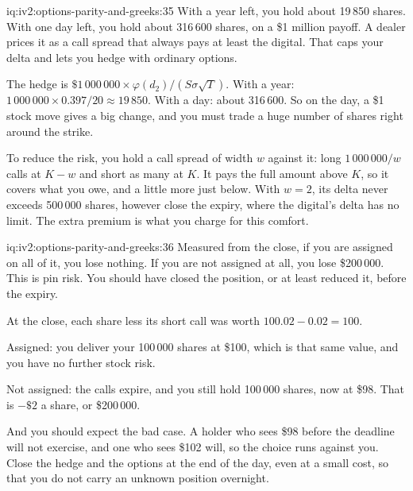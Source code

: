 \begin{solution}{iq:iv2:options-parity-and-greeks:35}
With a year left, you hold about 19\,850 shares. With one day left, you hold about 316\,600 shares, on a \$1 million payoff. A dealer prices it as a call spread that always pays at least the digital. That caps your delta and lets you hedge with ordinary options.

The hedge is $\$1\,000\,000 \times \varphi(d_2)/(S\sigma\sqrt T)$. With a year: $1\,000\,000 \times 0.397/20 \approx 19\,850$. With a day: about 316\,600. So on the day, a \$1 stock move gives a big change, and you must trade a huge number of shares right around the strike.

To reduce the risk, you hold a call spread of width $w$ against it: long $1\,000\,000/w$ calls at $K - w$ and short as many at $K$. It pays the full amount above $K$, so it covers what you owe, and a little more just below. With $w = 2$, its delta never exceeds 500\,000 shares, however close the expiry, where the digital's delta has no limit. The extra premium is what you charge for this comfort.

\end{solution}

\begin{solution}{iq:iv2:options-parity-and-greeks:36}
Measured from the close, if you are assigned on all of it, you lose nothing. If you are not assigned at all, you lose \$200\,000. This is pin risk. You should have closed the position, or at least reduced it, before the expiry.

At the close, each share less its short call was worth $100.02 - 0.02 = 100$.

Assigned: you deliver your 100\,000 shares at \$100, which is that same value, and you have no further stock risk.

Not assigned: the calls expire, and you still hold 100\,000 shares, now at \$98. That is $-\$2$ a share, or \$200\,000.

And you should expect the bad case. A holder who sees \$98 before the deadline will not exercise, and one who sees \$102 will, so the choice runs against you. Close the hedge and the options at the end of the day, even at a small cost, so that you do not carry an unknown position overnight.

\end{solution}


